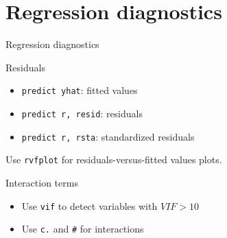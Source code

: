 \documentclass[t]{beamer}
\begin{document}
	\section{Regression diagnostics}
	
	\begin{frame}[t]{Regression diagnostics}

		\begin{block}{Residuals}

			\begin{itemize}
				\item \texttt{predict yhat}: fitted values
				\item \texttt{predict r, resid}: residuals
				\item \texttt{predict r, rsta}: standardized residuals		
			\end{itemize}
			
			Use \texttt{rvfplot} for residuals-versus-fitted values plots.

		\end{block}

		\begin{block}{Interaction terms}

			\begin{itemize}
				\item Use \texttt{vif} to detect variables with $VIF > 10$
				\item Use \texttt{c.} and \texttt{\#} for interactions
			\end{itemize}

		\end{block}
		
	\end{frame}

\end{document}
